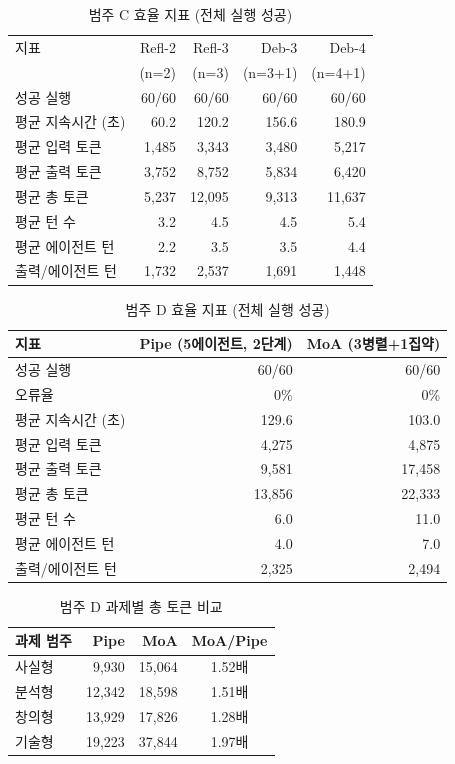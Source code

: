 \documentclass[a4paper,11pt]{article}
\begin{document}
\begin{table}[H]
\centering
\caption{범주 C 효율 지표 (전체 실행 성공)}
\label{tab:cat-c}
{\small
\begin{tabular}{lrrrr}
\toprule
지표 & Refl-2 & Refl-3 & Deb-3 & Deb-4 \\
    & (n=2)  & (n=3)  & (n=3+1) & (n=4+1) \\
\midrule
성공 실행       & 60/60 & 60/60 & 60/60 & 60/60 \\
평균 지속시간 (초) & 60.2 & 120.2 & 156.6 & 180.9 \\
평균 입력 토큰   & 1,485 & 3,343 & 3,480 & 5,217 \\
평균 출력 토큰   & 3,752 & 8,752 & 5,834 & 6,420 \\
평균 총 토큰     & 5,237 & 12,095 & 9,313 & 11,637 \\
평균 턴 수       & 3.2 & 4.5 & 4.5 & 5.4 \\
평균 에이전트 턴 & 2.2 & 3.5 & 3.5 & 4.4 \\
출력/에이전트 턴 & 1,732 & 2,537 & 1,691 & 1,448 \\
\bottomrule
\end{tabular}
}
\end{table}

\begin{table}[H]
\centering
\caption{범주 D 효율 지표 (전체 실행 성공)}
\label{tab:cat-d}
{\small
\begin{tabular}{lrr}
\toprule
지표 & Pipe (5에이전트, 2단계) & MoA (3병렬+1집약) \\
\midrule
성공 실행       & 60/60 & 60/60 \\
오류율           & 0\% & 0\% \\
평균 지속시간 (초) & 129.6 & 103.0 \\
평균 입력 토큰   & 4,275 & 4,875 \\
평균 출력 토큰   & 9,581 & 17,458 \\
평균 총 토큰     & 13,856 & 22,333 \\
평균 턴 수       & 6.0 & 11.0 \\
평균 에이전트 턴 & 4.0 & 7.0 \\
출력/에이전트 턴 & 2,325 & 2,494 \\
\bottomrule
\end{tabular}
}
\end{table}

\begin{table}[H]
\centering
\caption{범주 D 과제별 총 토큰 비교}
\label{tab:cat-d-task}
{\small
\begin{tabular}{lrrc}
\toprule
과제 범주 & Pipe & MoA & MoA/Pipe \\
\midrule
사실형 & 9,930  & 15,064 & 1.52배 \\
분석형 & 12,342 & 18,598 & 1.51배 \\
창의형 & 13,929 & 17,826 & 1.28배 \\
기술형 & 19,223 & 37,844 & 1.97배 \\
\bottomrule
\end{tabular}
}
\end{table}
\end{document}
